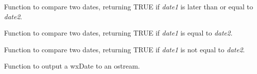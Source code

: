 
Function to compare two dates, returning TRUE if {\it date1} is later than or equal to {\it date2}.

\label{wxdateequals}


Function to compare two dates, returning TRUE if {\it date1} is equal to {\it date2}.

\label{wxdatenotequals}


Function to compare two dates, returning TRUE if {\it date1} is not equal to {\it date2}.

\label{wxdateinsert}


Function to output a wxDate to an ostream.


